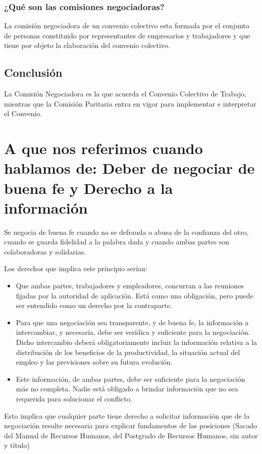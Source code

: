 \documentclass[a4paper, 12pt]{article}
\begin{document}
\subsubsection{¿Qué son las comisiones negociadoras?}
La comisión negociadora de un convenio colectivo esta formada por el conjunto de personas constituido por representantes de empresarios y trabajadores y que tiene por objeto la elaboración del convenio colectivo.


\subsection{Conclusión}
La Comisión Negociadora es la que acuerda el Convenio Colectivo de Trabajo, mientras que la Comisión Paritaria entra en vigor para implementar e interpretar el Convenio.

\section{A que nos referimos cuando hablamos de:  Deber de negociar de buena fe y Derecho a la información}

Se negocia de buena fe cuando no se defrauda o abusa de la confianza del otro, cuando se guarda fidelidad a la palabra dada y cuando ambas partes son colaboradoras y solidarias. 

Los derechos que implica este principio serían: 
\begin{itemize}
\item Que ambas partes, trabajadores y empleadores, concurran a las reuniones fijadas por la autoridad de aplicación. Está como una obligación, pero puede ser entendido como un derecho por la contraparte.
\item Para que una negociación sea transparente, y de buena fe, la información a intercambiar, y necesaria, debe ser verídica y suficiente para la negociación. Dicho intercambio deberá obligatoriamente incluir la información relativa a la distribución de los beneficios de la productividad, la situación actual del empleo y las previsiones sobre su futura evolución.
\item Este información, de ambas partes, debe ser suficiente para la negociación más no completa. Nadie está obligado a brindar información que no sea requerida para solucionar el conflicto.
\end{itemize}

Esto implica que cualquier parte tiene derecho a solicitar información que de la negociación resulte necesaria para explicar fundamentos de las posiciones (Sacado del Manual de Recursos Humanos, del Postgrado de Recursos Humanos, sin autor y título)
\end{document}
